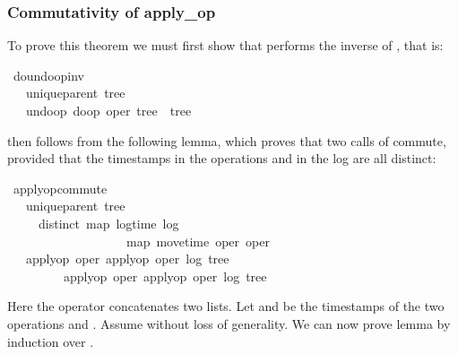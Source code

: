 \documentclass[sigplan,anonymous]{acmart}
\renewenvironment{isabelle}{%
  \medbreak\noindent%
  \renewcommand{\isanewline}{\\}%
  \begin{minipage}{\columnwidth}%
  \begin{isabellebody}%
  \begin{tabbing}%
}{%
  \end{tabbing}%
  \end{isabellebody}%
  \end{minipage}%
  \medbreak%
}
\renewcommand{\isacartoucheopen}{}
\renewcommand{\isacartoucheclose}{}
\begin{document}
\subsubsection{Commutativity of apply\_op}\label{sec:commutativity}

To prove this theorem we must first show that  performs the inverse of , that is:
\begin{isabelle}
\isamarkupfalse%
\ do{\isacharunderscore}undo{\isacharunderscore}op{\isacharunderscore}inv{\isacharcolon}\isanewline
\ \ \ {\isacartoucheopen}unique{\isacharunderscore}parent\ tree{\isacartoucheclose}\isanewline
\ \ \ {\isacartoucheopen}undo{\isacharunderscore}op\ {\isacharparenleft}do{\isacharunderscore}op\ {\isacharparenleft}oper{\isacharcomma}\ tree{\isacharparenright}{\isacharparenright}\ {\isacharequal}\ tree{\isacartoucheclose}
\end{isabelle}

\noindent {} then follows from the following lemma, which proves that two calls of  commute, provided that the timestamps in the operations and in the log are all distinct:
\begin{isabelle}
\isamarkupfalse%
\ apply{\isacharunderscore}op{\isacharunderscore}commute{}{\isacharcolon}\isanewline
\ \ \ {\isacartoucheopen}unique{\isacharunderscore}parent\ tree{\isacartoucheclose}\isanewline
\ \ \ \ \ {\isacartoucheopen}distinct\ {\isacharparenleft}{\isacharparenleft}map\ log{\isacharunderscore}time\ log{\isacharparenright}\ {\isacharat}\isanewline
\ \ \ \ \ \ \ \ \ \ \ \ \ \ \ \ \ \ \ {\isacharparenleft}map\ move{\isacharunderscore}time\ {\isacharbrackleft}oper{}{\isacharcomma}\ oper{}{\isacharbrackright}{\isacharparenright}{\isacharparenright}{\isacartoucheclose}\isanewline
\ \ \ {\isacartoucheopen}apply{\isacharunderscore}op\ oper{}\ {\isacharparenleft}apply{\isacharunderscore}op\ oper{}\ {\isacharparenleft}log{\isacharcomma}\ tree{\isacharparenright}{\isacharparenright}\ {\isacharequal}\isanewline
\ \ \ \ \ \ \ \ \ apply{\isacharunderscore}op\ oper{}\ {\isacharparenleft}apply{\isacharunderscore}op\ oper{}\ {\isacharparenleft}log{\isacharcomma}\ tree{\isacharparenright}{\isacharparenright}{\isacartoucheclose}
\end{isabelle}

\noindent Here the \isa{\isacharat} operator concatenates two lists.
Let  and  be the timestamps of the two operations  and .
Assume  without loss of generality.
We can now prove lemma  by induction over .
\end{document}
